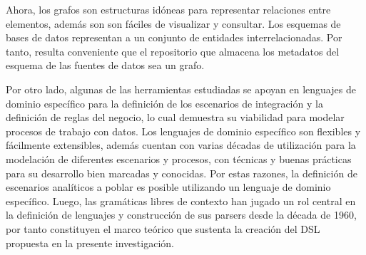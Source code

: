 Ahora, los grafos son estructuras idóneas para representar relaciones entre elementos, además son son f\'aciles 
de visualizar y consultar. Los esquemas de bases de 
datos representan a un conjunto de entidades interrelacionadas. Por tanto, resulta conveniente que el repositorio 
que almacena los metadatos del esquema de las fuentes de datos sea un grafo.

Por otro lado, algunas de las herramientas estudiadas se apoyan en lenguajes de dominio específico para la definición 
de los escenarios de integración y la definición de reglas del negocio, lo cual demuestra su viabilidad para modelar 
procesos de trabajo con datos. Los lenguajes de dominio específico son flexibles y fácilmente extensibles, además 
cuentan con varias décadas de utilización para la modelación de diferentes escenarios y procesos, con técnicas y 
buenas prácticas para su desarrollo bien marcadas y conocidas. Por estas razones, la definición de escenarios 
analíticos a poblar es posible utilizando un lenguaje de dominio específico. Luego, las gramáticas libres de 
contexto han jugado un rol central en la definición de lenguajes y construcción de sus parsers desde la década 
de 1960\cite{hopcroft_introduction_2007}, por tanto constituyen el marco teórico que sustenta la creación 
del DSL propuesta en la presente investigación.